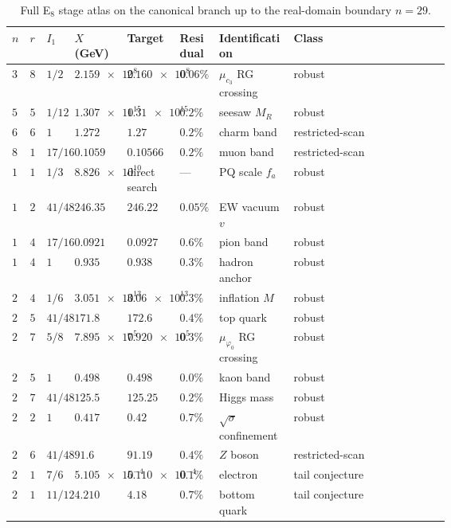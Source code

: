 \documentclass[11pt,a4paper]{article}
\theoremstyle{definition}
\theoremstyle{remark}
\newcommand{\cthree}{c_3}
\newcommand{\phiz}{\varphi_0}
\begin{document}
\begin{table}[H]
\centering
\scriptsize
\setlength{\tabcolsep}{2pt}
\begin{tabularx}{\linewidth}{@{}>{\centering\arraybackslash}p{0.035\linewidth}>{\centering\arraybackslash}p{0.035\linewidth}>{\raggedright\arraybackslash}p{0.065\linewidth}>{\raggedleft\arraybackslash}p{0.12\linewidth}>{\raggedleft\arraybackslash}p{0.12\linewidth}>{\raggedright\arraybackslash}p{0.09\linewidth}>{\raggedright\arraybackslash}p{0.17\linewidth}Y@{}}
\toprule
$n$ & $r$ & $I_1$ & $X$ (GeV) & Target & Residual & Identification & Class \\
\midrule
$3$ & $8$ & $1/2$ & $\num{2.159e8}$ & $\num{2.160e8}$ & $0.06\%$ & $\mu_{\cthree}$ RG crossing & robust \\
$5$ & $5$ & $1/12$ & $\num{1.307e15}$ & $\num{1.31e15}$ & $0.2\%$ & seesaw $M_R$ & robust \\
$6$ & $6$ & $1$ & $\num{1.272}$ & $\num{1.27}$ & $0.2\%$ & charm band & restricted-scan \\
$8$ & $1$ & $17/16$ & $\num{0.1059}$ & $\num{0.10566}$ & $0.2\%$ & muon band & restricted-scan \\
$10$ & $1$ & $1/3$ & $\num{8.826e10}$ & direct search & --- & PQ scale $f_a$ & robust \\
$12$ & $2$ & $41/48$ & $\num{246.35}$ & $\num{246.22}$ & $0.05\%$ & EW vacuum $v$ & robust \\
$14$ & $4$ & $17/16$ & $\num{0.0921}$ & $\num{0.0927}$ & $0.6\%$ & pion band & robust \\
$15$ & $4$ & $1$ & $\num{0.935}$ & $\num{0.938}$ & $0.3\%$ & hadron anchor & robust \\
$21$ & $4$ & $1/6$ & $\num{3.051e13}$ & $\num{3.06e13}$ & $0.3\%$ & inflation $M$ & robust \\
$21$ & $5$ & $41/48$ & $\num{171.8}$ & $\num{172.6}$ & $0.4\%$ & top quark & robust \\
$24$ & $7$ & $5/8$ & $\num{7.895e5}$ & $\num{7.920e5}$ & $0.3\%$ & $\mu_{\phiz}$ RG crossing & robust \\
$25$ & $5$ & $1$ & $\num{0.498}$ & $\num{0.498}$ & $0.0\%$ & kaon band & robust \\
$25$ & $7$ & $41/48$ & $\num{125.5}$ & $\num{125.25}$ & $0.2\%$ & Higgs mass & robust \\
$26$ & $2$ & $1$ & $\num{0.417}$ & $\num{0.42}$ & $0.7\%$ & $\sqrt{\sigma}$ confinement & robust \\
$27$ & $6$ & $41/48$ & $\num{91.6}$ & $\num{91.19}$ & $0.4\%$ & $Z$ boson & restricted-scan \\
$28$ & $1$ & $7/6$ & $\num{5.105e-4}$ & $\num{5.110e-4}$ & $0.1\%$ & electron & tail conjecture \\
$29$ & $1$ & $11/12$ & $\num{4.210}$ & $\num{4.18}$ & $0.7\%$ & bottom quark & tail conjecture \\
\bottomrule
\end{tabularx}
\caption{Full E$_8$ stage atlas on the canonical branch up to the real-domain boundary $n=29$.}
\label{tab:e8-full-atlas}
\end{table}
\end{document}
